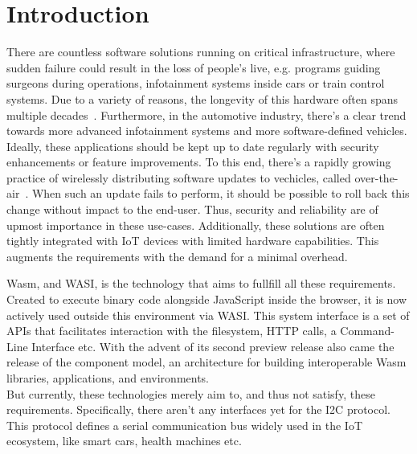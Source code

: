 \chapter{Introduction}
\label{chap:intro}


There are countless software solutions running on critical infrastructure, where sudden failure could result in the loss of people's live, e.g. programs guiding surgeons during operations, infotainment systems inside cars or train control systems. Due to a variety of reasons, the longevity of this hardware often spans multiple decades~\cite{ars:trains}. Furthermore, in the automotive industry, there's a clear trend towards more advanced infotainment systems and more software-defined vehicles. Ideally, these applications should be kept up to date regularly with security enhancements or feature improvements. To this end, there's a rapidly growing practice of wirelessly distributing software updates to vechicles, called over-the-air~\cite{aptiv:ota}.
When such an update fails to perform, it should be possible to roll back this change without impact to the end-user. Thus, security and reliability are of upmost importance in these use-cases. Additionally, these solutions are often tightly integrated with \gls{IoT} devices with limited hardware capabilities. This augments the requirements with the demand for a minimal overhead.

\gls{Wasm}, and \gls{WASI}, is the technology that aims to fullfill all these requirements. Created to execute binary code alongside JavaScript inside the browser, it is now actively used outside this environment via \gls{WASI}. This system interface is a set of APIs that facilitates interaction with the filesystem, HTTP calls, a Command-Line Interface etc. With the advent of its second preview release also came the release of the component model, an architecture for building interoperable \gls{Wasm} libraries, applications, and environments. \\
But currently, these technologies merely aim to, and thus not satisfy, these requirements. Specifically, there aren't any interfaces yet for the \gls{I2C} protocol. This protocol defines a serial communication bus widely used in the \gls{IoT} ecosystem, like smart cars, health machines etc.

